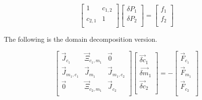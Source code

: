   \begin{equation}
\label{eqn:domainMatrix5}
 \begin{bmatrix} 
1 & c_{1,2}  \\
c_{2,1} & 1 \\
 \end{bmatrix} \begin{bmatrix}
 \delta P_{1} \\
 \delta P_{2} \\
\end{bmatrix}  = \begin{bmatrix}
 f_1 \\
 f_2 \\
\end{bmatrix}
 \end{equation}
 
 The following is the domain decomposition version.
 
 \begin{equation}
\label{eqn:domainDecomp0}
 \begin{bmatrix} 
\vec{J}_{c_1} & \vec{\Xi}_{c_1,m_1} & \vec{0} \\
\vec{J}_{m_1,c_1} & \vec{J}_{m_1} & \vec{J}_{m_1,c_2}  \\
\vec{0} & \vec{\Xi}_{c_2,m_1} & \vec{J}_{c_2} \\
 \end{bmatrix} \begin{bmatrix}
 \vec{\delta c}_{1} \\
 \vec{\delta m}_{1} \\
 \vec{\delta c}_{2} \\
\end{bmatrix}  = -\begin{bmatrix}
 \vec{F}_{c_1} \\
 \vec{F}_{m_1} \\
 \vec{F}_{c_2} \\
\end{bmatrix}
 \end{equation}
 
